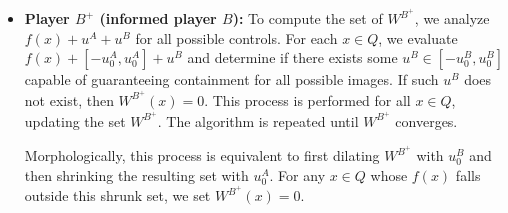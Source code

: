 \begin{itemize}
\item {\bf Player $B^+$ (informed player $B$):}
To compute the set of $W^{B^+}$, we analyze $f(x)+u^A+u^B$ for all possible controls. For each $x \in Q$, we evaluate $f(x)+[-u_0^A,u_0^A]+u^B$ and determine if there exists some $u^B \in [-u_0^B,u_0^B]$ capable of guaranteeing containment for all possible images. If such $u^B$ does not exist, then $W^{B^+}(x)=0$. This process is performed for all $x \in Q$, updating the set $W^{B^+}$. The algorithm is repeated until $W^{B^+}$ converges.

Morphologically, this process is equivalent to first dilating $W^{B^+}$ with $u_0^B$ and then shrinking the resulting set with $u_0^A$. For any $x \in Q$ whose $f(x)$ falls outside this shrunk set, we set $W^{B^+}(x)=0$.
\end{itemize}





